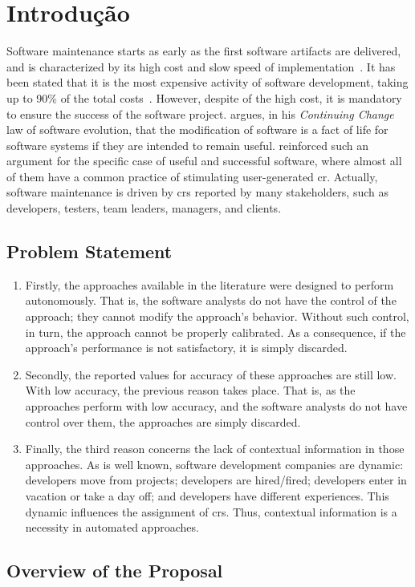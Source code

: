 \chapter{Introdução}
\label{chp:introdução}


Software maintenance starts as early as the first software artifacts are
delivered, and is characterized by its high cost and slow speed of
implementation~\citep{swebok2004}. It has been stated that it is the most
expensive activity of software development, taking up to 90\% of the total
costs~\citep{Eastwood1993,Erlikh2000}. However, despite of the high cost, it is
mandatory to ensure the success of the software project. \citet{Lehman1980}
argues, in his \emph{Continuing Change} law of software evolution, that the
modification of software is a fact of life for software systems if they are
intended to remain useful. \citet{Bennett2000} reinforced such an argument for
the specific case of useful and successful software, where almost all of them
have a common practice of stimulating user-generated \ac{cr}. Actually, software
maintenance is driven by \acp{cr} reported by many stakeholders, such as
developers, testers, team leaders, managers, and clients.


\lipsum[2-4]

\section{Problem Statement}
\label{sec:intro-problem-statement}

\lipsum[3-5]

\begin{enumerate}
  \item Firstly, the approaches available in the literature were designed to
  perform autonomously. That is, the software analysts do not have the control
  of the approach; they cannot modify the approach's behavior. Without
  such control, in turn, the approach cannot be properly calibrated. As a
  consequence, if the approach's performance is not satisfactory, it is simply
  discarded.
  \item Secondly, the reported values for accuracy of these approaches are
  still low. With low accuracy, the previous reason takes place. That is, as the
  approaches perform with low accuracy, and the software analysts do not have
  control over them, the approaches are simply discarded.
  \item Finally, the third reason concerns the lack of contextual information in
  those approaches. As is well known, software development companies are
  dynamic: developers move from projects; developers are hired/fired;
  developers enter in vacation or take a day off; and developers have different
  experiences. This dynamic influences the assignment of \acp{cr}. Thus,
  contextual information is a necessity in automated approaches.
\end{enumerate}

\section{Overview of the Proposal}
\lipsum[1-5]